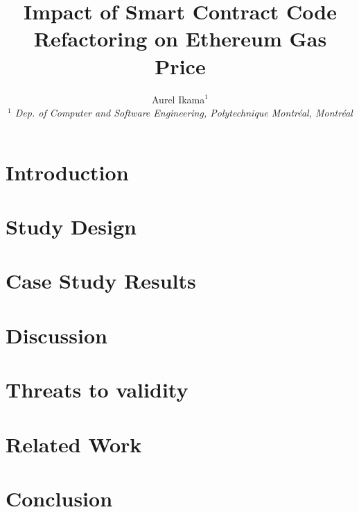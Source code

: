 \documentclass[10pt, conference]{IEEEtran}
\title{Impact of Smart Contract Code Refactoring on Ethereum Gas Price
}
\author{Aurel Ikama$^{1}$
    \\
    \emph{$^{1}$ Dep. of Computer and Software Engineering, Polytechnique Montréal, Montréal}}
\begin{document}
\maketitle






\section{Introduction}

\section{Study Design}

\section{Case Study Results}




\section{Discussion}


\section{Threats to validity}


\section{Related Work}


\section{Conclusion}


\balance



\end{document}
